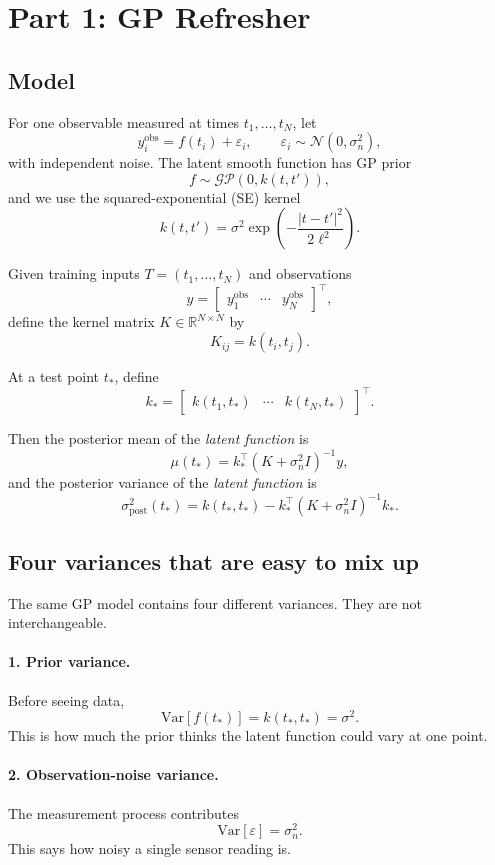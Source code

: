 \documentclass[11pt]{article}
\begin{document}
\section{Part 1: GP Refresher}

\subsection*{Model}
For one observable measured at times $t_1,\dots,t_N$, let
\[
y_i^{\mathrm{obs}} = f(t_i) + \varepsilon_i,
\qquad
\varepsilon_i \sim \mathcal{N}(0,\sigma_n^2),
\]
with independent noise. The latent smooth function has GP prior
\[
f \sim \mathcal{GP}(0,k(t,t')),
\]
and we use the squared-exponential (SE) kernel
\[
k(t,t') = \sigma^2 \exp\!\left(-\frac{|t-t'|^2}{2\ell^2}\right).
\]

Given training inputs $T=(t_1,\dots,t_N)$ and observations
\[
y = \begin{bmatrix}
y_1^{\mathrm{obs}} & \cdots & y_N^{\mathrm{obs}}
\end{bmatrix}^\top,
\]
define the kernel matrix $K \in \mathbb{R}^{N\times N}$ by
\[
K_{ij} = k(t_i,t_j).
\]

At a test point $t_*$, define
\[
k_* = \begin{bmatrix}
k(t_1,t_*) & \cdots & k(t_N,t_*)
\end{bmatrix}^\top.
\]

Then the posterior mean of the \emph{latent function} is
\[
\mu(t_*) = k_*^\top (K+\sigma_n^2 I)^{-1} y,
\]
and the posterior variance of the \emph{latent function} is
\[
\sigma^2_{\mathrm{post}}(t_*) =
k(t_*,t_*) - k_*^\top (K+\sigma_n^2 I)^{-1}k_*.
\]

\subsection*{Four variances that are easy to mix up}
The same GP model contains four different variances. They are not interchangeable.

\paragraph{1. Prior variance.}
Before seeing data,
\[
\mathrm{Var}[f(t_*)] = k(t_*,t_*) = \sigma^2.
\]
This is how much the prior thinks the latent function could vary at one point.

\paragraph{2. Observation-noise variance.}
The measurement process contributes
\[
\mathrm{Var}[\varepsilon] = \sigma_n^2.
\]
This says how noisy a single sensor reading is.
\end{document}
